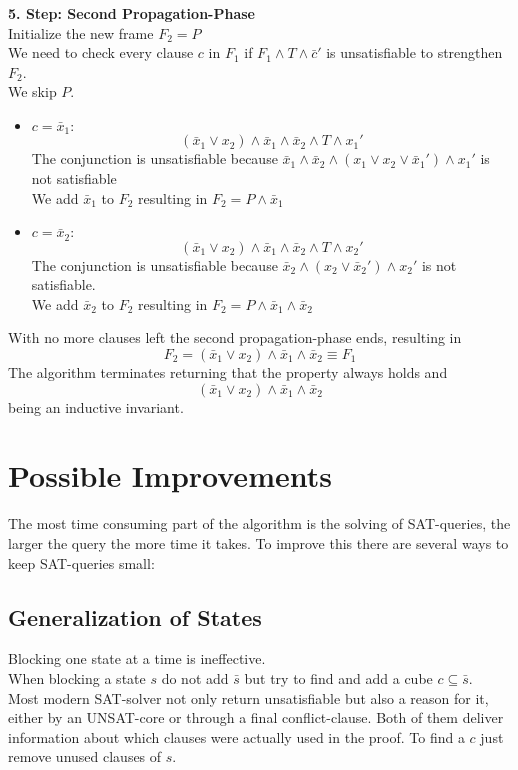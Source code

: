 \documentclass[11pt, a4paper, BCOR=10mm, ngerman, oneside]{scrbook}
\begin{document}
\textbf{5. Step: Second Propagation-Phase} \\
Initialize the new frame $F_2 = P$ \\
We need to check every clause $c$ in $F_1$ if $F_1 \land T \land \bar c'$ is unsatisfiable to strengthen $F_2$.\\ We  skip $P$. 
\begin{itemize}
\item $c = \bar x_1:$
\begin{equation*}
(\bar x_1 \lor x_2) \land \bar x_1 \land \bar x_2 \land T \land x_1'
\end{equation*}
The conjunction is unsatisfiable because $\bar x_1 \land \bar x_2 \land (x_1 \lor x_2 \lor \bar x_1') \land x_1'$ is not satisfiable \\
We add $\bar x_1$ to $F_2$ resulting in
$F_2 = P \land \bar x_1$ \\

\item $c = \bar x_2:$ 
\begin{equation*}
(\bar x_1 \lor x_2) \land \bar x_1 \land \bar x_2 \land T \land x_2'
\end{equation*}
The conjunction is unsatisfiable because $\bar x_2 \land (x_2 \lor \bar x_2') \land x_2'$ is not satisfiable. \\
We add $\bar x_2$ to $F_2$ resulting in
$F_2 = P \land \bar x_1 \land \bar x_2$

\end{itemize}

With no more clauses left the second propagation-phase ends, resulting in 
\begin{equation*}
F_2 = (\bar x_1 \lor x_2) \land \bar x_1 \land \bar x_2 \equiv F_1
\end{equation*}
The algorithm terminates returning that the property always holds and
\begin{equation*}
(\bar x_1 \lor x_2) \land \bar x_1 \land \bar x_2
\end{equation*}
 being an inductive invariant.

\section{Possible Improvements}
The most time consuming part of the algorithm is the solving of SAT-queries, the larger the query the more time it takes. To improve this there are several ways to keep SAT-queries small:

\subsection{Generalization of States}
Blocking one state at a time is ineffective.  \\
When blocking a state $s$ do not add $\bar s$ but try to find and add a cube $c \subseteq \bar s$. \\
Most modern SAT-solver not only return unsatisfiable but also a reason for it, either by an UNSAT-core or through a final conflict-clause. Both of them deliver information about which clauses were actually used in the proof. To find a $c$ just remove unused clauses of $s$.
\end{document}
